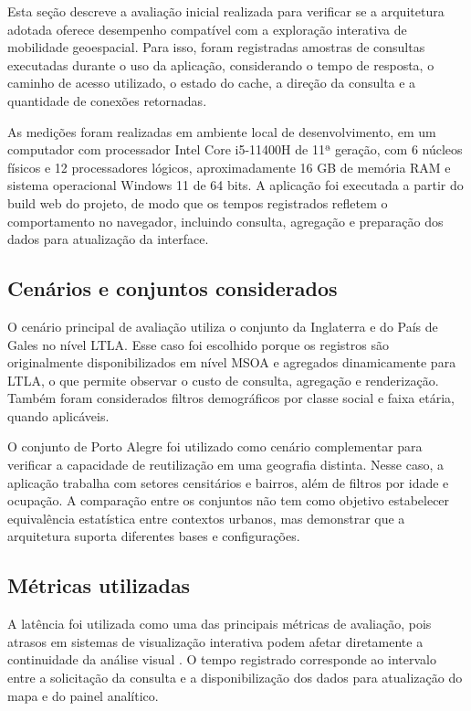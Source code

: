 \documentclass[12pt]{article}
\begin{document}
Esta seção descreve a avaliação inicial realizada para verificar se a arquitetura adotada oferece desempenho compatível com a exploração interativa de mobilidade geoespacial. Para isso, foram registradas amostras de consultas executadas durante o uso da aplicação, considerando o tempo de resposta, o caminho de acesso utilizado, o estado do cache, a direção da consulta e a quantidade de conexões retornadas.

As medições foram realizadas em ambiente local de desenvolvimento, em um computador com processador Intel Core i5-11400H de 11ª geração, com 6 núcleos físicos e 12 processadores lógicos, aproximadamente 16 GB de memória RAM e sistema operacional Windows 11 de 64 bits. A aplicação foi executada a partir do build web do projeto, de modo que os tempos registrados refletem o comportamento no navegador, incluindo consulta, agregação e preparação dos dados para atualização da interface.

\subsection{Cenários e conjuntos considerados}

O cenário principal de avaliação utiliza o conjunto da Inglaterra e do País de Gales no nível LTLA. Esse caso foi escolhido porque os registros são originalmente disponibilizados em nível MSOA e agregados dinamicamente para LTLA, o que permite observar o custo de consulta, agregação e renderização. Também foram considerados filtros demográficos por classe social e faixa etária, quando aplicáveis.

O conjunto de Porto Alegre foi utilizado como cenário complementar para verificar a capacidade de reutilização em uma geografia distinta. Nesse caso, a aplicação trabalha com setores censitários e bairros, além de filtros por idade e ocupação. A comparação entre os conjuntos não tem como objetivo estabelecer equivalência estatística entre contextos urbanos, mas demonstrar que a arquitetura suporta diferentes bases e configurações.

\subsection{Métricas utilizadas}

A latência foi utilizada como uma das principais métricas de avaliação, pois atrasos em sistemas de visualização interativa podem afetar diretamente a continuidade da análise visual \cite{liu2014latency}. O tempo registrado corresponde ao intervalo entre a solicitação da consulta e a disponibilização dos dados para atualização do mapa e do painel analítico.
\end{document}

